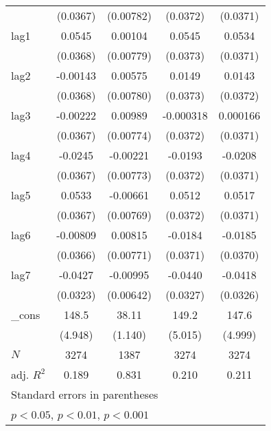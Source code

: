{\begin{tabular}{l*{4}{c}}
            &    (0.0367)         &   (0.00782)         &    (0.0372)         &    (0.0371)         \\
[1em]
lag1        &      0.0545         &     0.00104         &      0.0545         &      0.0534         \\
            &    (0.0368)         &   (0.00779)         &    (0.0373)         &    (0.0371)         \\
[1em]
lag2        &    -0.00143         &     0.00575         &      0.0149         &      0.0143         \\
            &    (0.0368)         &   (0.00780)         &    (0.0373)         &    (0.0372)         \\
[1em]
lag3        &    -0.00222         &     0.00989         &   -0.000318         &    0.000166         \\
            &    (0.0367)         &   (0.00774)         &    (0.0372)         &    (0.0371)         \\
[1em]
lag4        &     -0.0245         &    -0.00221         &     -0.0193         &     -0.0208         \\
            &    (0.0367)         &   (0.00773)         &    (0.0372)         &    (0.0371)         \\
[1em]
lag5        &      0.0533         &    -0.00661         &      0.0512         &      0.0517         \\
            &    (0.0367)         &   (0.00769)         &    (0.0372)         &    (0.0371)         \\
[1em]
lag6        &    -0.00809         &     0.00815         &     -0.0184         &     -0.0185         \\
            &    (0.0366)         &   (0.00771)         &    (0.0371)         &    (0.0370)         \\
[1em]
lag7        &     -0.0427         &    -0.00995         &     -0.0440         &     -0.0418         \\
            &    (0.0323)         &   (0.00642)         &    (0.0327)         &    (0.0326)         \\
[1em]
\_cons      &       148.5\sym{***}&       38.11\sym{***}&       149.2\sym{***}&       147.6\sym{***}\\
            &     (4.948)         &     (1.140)         &     (5.015)         &     (4.999)         \\
\hline
\(N\)       &        3274         &        1387         &        3274         &        3274         \\
adj. \(R^{2}\)&       0.189         &       0.831         &       0.210         &       0.211         \\
\hline\hline
\multicolumn{5}{l}{\footnotesize Standard errors in parentheses}\\
\multicolumn{5}{l}{\footnotesize \sym{*} \(p<0.05\), \sym{**} \(p<0.01\), \sym{***} \(p<0.001\)}\\
\end{tabular}
}
